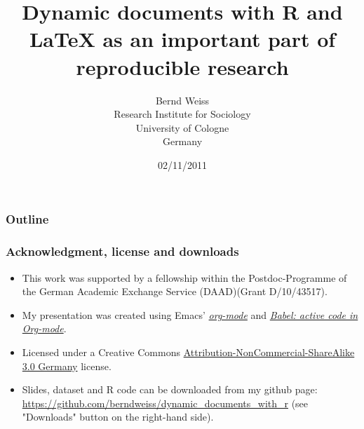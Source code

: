 \documentclass[bigger]{beamer}
\begin{document}
\title{Dynamic documents with R and \LaTeX{} as an important part of reproducible research}
\author{Bernd Weiss\\Research Institute for Sociology\\University of Cologne\\Germany\\}
\date{02/11/2011 \vfill \byncsa}
\maketitle

\begin{frame}
\frametitle{Outline}
\setcounter{tocdepth}{3}
\tableofcontents
\end{frame}





\newcommand{\infobox}[1]{
  \vfill\vfill\hrule
  \begin{columns}[t]
    \begin{column}{0.02\textwidth}
      \Info
    \end{column}
    \begin{column}[T]{0.97\textwidth}
      \tiny{#1}
    \end{column}
\end{columns}}



\begin{frame}\frametitle{Acknowledgment, license and downloads}
\begin{itemize}
\item This work was supported by a fellowship within the Postdoc-Programme of the German Academic
  Exchange Service (DAAD)(Grant D/10/43517).
\item My presentation was created using Emacs' \href{http://orgmode.org/}{\emph{org-mode}} and
\href{http://orgmode.org/worg/org-contrib/babel/}{\emph{Babel: active code in
Org-mode}}. 
\item Licensed under a Creative Commons
\href{http://creativecommons.org/licenses/by-nc-sa/3.0/de/deed.en}{Attribution-NonCommercial-ShareAlike
3.0 Germany} license.
\item Slides, dataset and R code can be downloaded from my github page:
\href{https://github.com/berndweiss/dynamic_documents_with_r}{https://github.com/berndweiss/dynamic_documents_with_r} (see
"Downloads" button on the right-hand side).
\end{itemize}
\end{frame}
\end{document}
